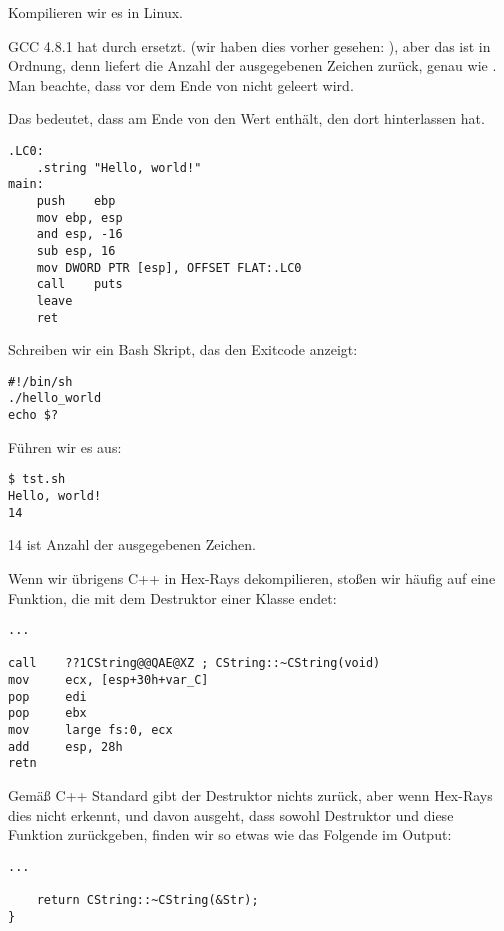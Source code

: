 Kompilieren wir es in Linux.

GCC 4.8.1 hat \printf durch \puts ersetzt. 
(wir haben dies vorher gesehen: ), aber das ist in Ordnung,
denn \puts liefert die Anzahl der ausgegebenen Zeichen zurück, genau wie \printf.
Man beachte, dass \EAX vor dem Ende von \main nicht geleert wird.

Das bedeutet, dass \EAX am Ende von \main den Wert enthält, den \puts dort hinterlassen hat.

\begin{lstlisting}[caption=GCC 4.8.1,style=customasmx86]
.LC0:
	.string	"Hello, world!"
main:
	push	ebp
	mov	ebp, esp
	and	esp, -16
	sub	esp, 16
	mov	DWORD PTR [esp], OFFSET FLAT:.LC0
	call	puts
	leave
	ret
\end{lstlisting}


Schreiben wir ein Bash Skript, das den Exitcode anzeigt:

\begin{lstlisting}[caption=tst.sh]
#!/bin/sh
./hello_world
echo $?
\end{lstlisting}

Führen wir es aus:

\begin{lstlisting}
$ tst.sh 
Hello, world!
14
\end{lstlisting}

14 ist Anzahl der ausgegebenen Zeichen.

Wenn wir übrigens C++ in Hex-Rays dekompilieren, stoßen wir häufig auf eine Funktion, die mit dem Destruktor einer
Klasse endet:

\begin{lstlisting}[style=customasmx86]
...

call    ??1CString@@QAE@XZ ; CString::~CString(void)
mov     ecx, [esp+30h+var_C]
pop     edi
pop     ebx
mov     large fs:0, ecx
add     esp, 28h
retn
\end{lstlisting}
Gemäß C++ Standard gibt der Destruktor nichts zurück, aber wenn Hex-Rays dies nicht erkennt, und davon ausgeht, dass
sowohl Destruktor und diese Funktion \Tint zurückgeben, finden wir so etwas wie das Folgende im Output:

\begin{lstlisting}[style=customc]
...

	return CString::~CString(&Str);
}
\end{lstlisting}

